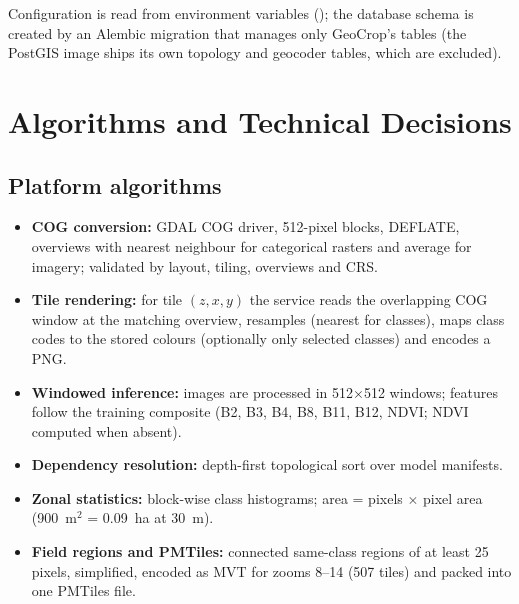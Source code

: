 Configuration is read from environment variables (); the database schema is created by an
Alembic migration that manages only GeoCrop's tables (the PostGIS image ships its own topology and
geocoder tables, which are excluded).

\section{Algorithms and Technical Decisions}
\subsection{Platform algorithms}
\begin{itemize}
  \item \textbf{COG conversion:} GDAL COG driver, 512-pixel blocks, DEFLATE, overviews with nearest
        neighbour for categorical rasters and average for imagery; validated by layout, tiling,
        overviews and CRS.
  \item \textbf{Tile rendering:} for tile $(z,x,y)$ the service reads the overlapping COG window at
        the matching overview, resamples (nearest for classes), maps class codes to the stored
        colours (optionally only selected classes) and encodes a PNG.
  \item \textbf{Windowed inference:} images are processed in 512$\times$512 windows; features follow
        the training composite (B2, B3, B4, B8, B11, B12, NDVI; NDVI computed when absent).
  \item \textbf{Dependency resolution:} depth-first topological sort over model manifests.
  \item \textbf{Zonal statistics:} block-wise class histograms; area = pixels $\times$ pixel area
        (900~m$^2$ = 0.09~ha at 30~m).
  \item \textbf{Field regions and PMTiles:} connected same-class regions of at least 25 pixels,
        simplified, encoded as MVT for zooms 8--14 (507 tiles) and packed into one PMTiles file.
\end{itemize}

